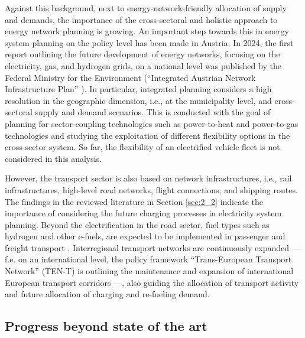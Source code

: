 \documentclass[final,10pt]{elsarticle}
\begin{document}
        Against this background, next to energy-network-friendly allocation of supply and demands, the importance of the cross-sectoral and holistic approach to energy network planning is growing. An important step towards this in energy system planning on the policy level has been made in Austria. In 2024, the first report outlining the future development of energy networks, focusing on the electricity, gas, and hydrogen grids, on a national level was published by the Federal Ministry for the Environment (\enquote{Integrated Austrian Network Infrastructure Plan} \cite{Netzinfrastrukturplan2024}). In particular, integrated planning considers a high resolution in the geographic dimension, i.e., at the municipality level, and cross-sectoral supply and demand scenarios. This is conducted with the goal of planning for sector-coupling technologies such as power-to-heat and power-to-gas technologies and studying the exploitation of different flexibility options in the cross-sector system. So far, the flexibility of an electrified vehicle fleet is not considered in this analysis. 
    
        However, the transport sector is also based on network infrastructures, i.e., rail infrastructures, high-level road networks, flight connections, and shipping routes. The findings in the reviewed literature in Section \ref{sec:2_2} indicate the importance of considering the future charging processes in electricity system planning. Beyond the electrification in the road sector, fuel types such as hydrogen and other e-fuels, are expected to be implemented in passenger and freight transport \cite{Auer2020}. Interregional transport networks are continuously expanded --- f.e. on an international level, the policy framework \enquote{Trans-European Transport Network} (TEN-T) is outlining the maintenance and expansion of international European transport corridors \cite{TEN_T2024} ---, also guiding the allocation of transport activity and future allocation of charging and re-fueling demand. 

     \subsection{Progress beyond state of the art}
\end{document}
